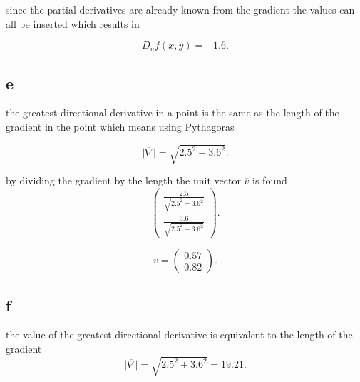 \documentclass[12pt,a4paper]{article}
\begin{document}
since the partial derivatives are already known from the gradient the values can all be inserted which results in

\[
	D_{\overline{u}}f(x,y)=-1.6
.\] 



\subsection{e}

the greatest directional derivative in a point is the same as the length of the gradient in the point which means using Pythagoras 

\[
 \mid \overline{\nabla } \mid = \sqrt{2.5^2+3.6^2} 
.\] 

by dividing the gradient by the length the unit vector $\overline{v}$ is found \[
\begin{pmatrix} \frac{2.5}{ \sqrt{2.5^2+3.6^2}}\\ \frac{3.6}{ \sqrt{2.5^2+3.6^2}} \end{pmatrix}
.\] 

\[
\overline{v}= \begin{pmatrix} 0.57\\ 0.82 \end{pmatrix}
.\] 

\subsection{f} 

the value of the greatest directional derivative is equivalent to the length of the gradient
\[
 \mid \overline{\nabla } \mid = \sqrt{2.5^2+3.6^2}=19.21 
.\] 
\end{document}
